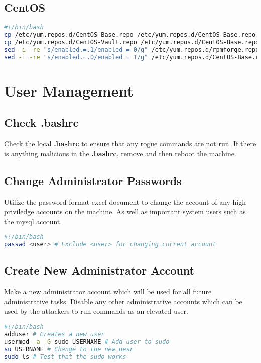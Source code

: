 \documentclass{article}
\begin{document}
\subsection{CentOS}
\begin{lstlisting}[language=bash]
#!/bin/bash
cp /etc/yum.repos.d/CentOS-Base.repo /etc/yum.repos.d/CentOS-Base.repo.bak # Backup sources
cp /etc/yum.repos.d/CentOS-Vault.repo /etc/yum.repos.d/CentOS-Base.repo # Overwrite with Vault
sed -i -re "s/enabled.=.1/enabled = 0/g" /etc/yum.repos.d/rpmforge.repo
sed -i -re "s/enabled.=.0/enabled = 1/g" /etc/yum.repos.d/CentOS-Base.repo
\end{lstlisting}


\section{User Management}
\subsection{Check .bashrc}
Check the local \textbf{.bashrc} to ensure that any rogue commands are not run.
If there is anything malicious in the \textbf{.bashrc}, remove and then reboot
the machine.

\subsection{Change Administrator Passwords}
Utilize the password format excel document to change the account of any
high-priviledge accounts on the machine. As well as important system users such
as the mysql account.

\begin{lstlisting}[language=bash]
#!/bin/bash
passwd <user> # Exclude <user> for changing current account
\end{lstlisting}

\subsection{Create New Administrator Account}
Make a new administrator account which will be used for all future
administrative tasks. Disable any other administrative accounts which can be
used by the attackers to run commands as an elevated user.

\begin{lstlisting}[language=bash]
#!/bin/bash
adduser # Creates a new user
usermod -a -G sudo USERNAME # Add user to sudo
su USERNAME # Change to the new uesr
sudo ls # Test that the sudo works
\end{lstlisting}
\end{document}
